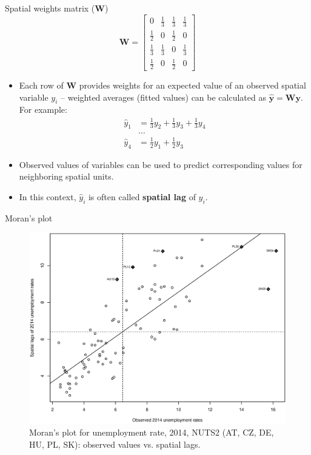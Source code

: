 \documentclass{beamer}
\begin{document}
\begin{frame}{Spatial weights matrix ($\bm{W}$)}
\vspace{-0.2cm}
$$
\bm{W}=
\begin{bmatrix}
0 & \tfrac{1}{3} & \tfrac{1}{3} & \tfrac{1}{3} \\[2pt]
\tfrac{1}{2} & 0 & \tfrac{1}{2} & 0 \\[2pt]
\tfrac{1}{3} & \tfrac{1}{3} & 0 & \tfrac{1}{3} \\[2pt]
\tfrac{1}{2} & 0 & \tfrac{1}{2} & 0
\end{bmatrix}
$$
\begin{itemize}
	\item Each row of $\bm{W}$ provides weights for an expected value of an observed spatial variable $y_i$ -- weighted averages (fitted values) can be calculated as $\hat{\bm{y}} = \bm{W \! y}$. For example:
	\begin{align*}
	\hat{y}_1 & =  \tfrac{1}{3} y_2 + \tfrac{1}{3} y_3 + \tfrac{1}{3} y_4 \\
	&\dots \\
	\hat{y}_4 & = \tfrac{1}{2} y_1  + \tfrac{1}{2} y_3 
	\end{align*}
	\item Observed values of variables can be used to predict corresponding values for neighboring spatial units.
	\smallskip
	\item In this context, $\hat{y}_i$ is often called \textbf{spatial lag} of $y_i$.
\end{itemize}
\end{frame}
\begin{frame}{Moran's plot}
\vspace{-0.3cm}
\begin{figure}
	\includegraphics[width=.7\textwidth]{IMG/sp_MoranPlot.eps}
	\caption[]{Moran's plot for unemployment rate, 2014, NUTS2 (AT, CZ, DE, HU, PL, SK): observed values vs. spatial lags.}
\end{figure}
\end{frame}
\end{document}
